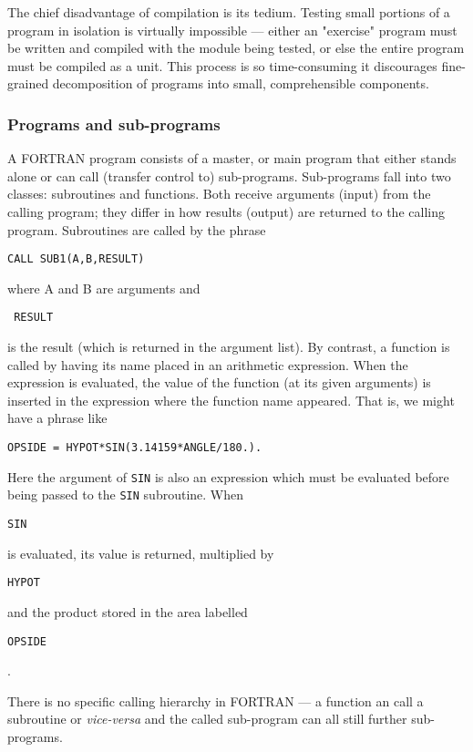 The chief disadvantage of compilation is its tedium. Testing small portions of a program in isolation is virtually impossible — either an "exercise" program must be written and compiled with the module being tested, or else the entire program must be compiled as a unit. This process is so time-consuming it discourages fine-grained decomposition of programs into small, comprehensible components.
 
\subsubsection{Programs and sub-programs} 

A FORTRAN program consists of a master, or main program that either stands alone or can call (transfer control to) sub-programs. Sub-programs fall into two classes: subroutines and functions. Both receive arguments (input) from the calling program; they differ in how results (output) are returned to the calling program. Subroutines are called by the phrase

\begin{verbatim}
CALL SUB1(A,B,RESULT)
\end{verbatim}

where A and B are arguments and \begin{verbatim} RESULT \end{verbatim} is the result (which is returned in the argument list). By contrast, a function is called by having its name placed in an arithmetic expression. When the expression is evaluated, the value of the function (at its given arguments) is inserted in the expression where the function name appeared. That is, we might have a phrase like

\begin{verbatim}
OPSIDE = HYPOT*SIN(3.14159*ANGLE/180.).
\end{verbatim}

Here the argument of \verb|SIN| is also an expression which must be evaluated before being passed to the \verb|SIN| subroutine. When \begin{verbatim}SIN\end{verbatim} is evaluated, its value is returned, multiplied by \begin{verbatim}HYPOT\end{verbatim} and the product stored in the area labelled \begin{verbatim}OPSIDE\end{verbatim}.

There is no specific calling hierarchy in FORTRAN — a function an call a subroutine or \textit{vice-versa} and the called sub-program can all still further sub-programs.

